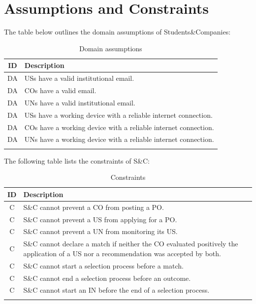 \section{Assumptions and Constraints}
The table below outlines the domain assumptions of Students\&Companies:

\setcounter{da}{1}
\newcommand{\dac}{\theda\stepcounter{da}}
\renewcommand{\arraystretch}{1.5}
\begin{longtable}{|c|p{12.5cm}|}
    \hline \rowcolor{polimiblue!40}
    \textbf{ID} & \textbf{Description} \\ \hline \hline
    DA\dac & USs have a valid institutional email. \\ \hline
    DA\dac & COs have a valid email. \\ \hline
    DA\dac & UNs have a valid institutional email. \\ \hline
    DA\dac & USs have a working device with a reliable internet connection. \\ \hline
    DA\dac & COs have a working device with a reliable internet connection. \\ \hline
    DA\dac & UNs have a working device with a reliable internet connection. \\ \hline
\caption{Domain assumptions}
\end{longtable}

The following table lists the constraints of S\&C: 

\setcounter{c}{1}
\newcommand{\cc}{\thec\stepcounter{c}}
\renewcommand{\arraystretch}{1.5}
\begin{longtable}{|c|p{12.5cm}|}
    \hline \rowcolor{polimiblue!40}
    \textbf{ID} & \textbf{Description} \\ \hline \hline
    C\cc & S\&C cannot prevent a CO from posting a PO. \\ \hline
    C\cc & S\&C cannot prevent a US from applying for a PO. \\ \hline
    C\cc & S\&C cannot prevent a UN from monitoring its US. \\ \hline
    C\cc & S\&C cannot declare a match if neither the CO evaluated positively the application of a US nor a recommendation was accepted by both. \\ \hline
    C\cc & S\&C cannot start a selection process before a match. \\ \hline
    C\cc & S\&C cannot end a selection process before an outcome. \\ \hline
    C\cc & S\&C cannot start an IN before the end of a selection process. \\ \hline
\caption{Constraints}
\end{longtable}
